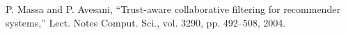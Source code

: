 \documentclass[12pt,letterpaper,openany]{book}
\begin{document}








\begin{thebibliography}{1}
 P. Massa and P. Avesani, “Trust-aware collaborative filtering for recommender systems,” Lect. Notes Comput. Sci., vol. 3290, pp. 492–508, 2004.
\end{thebibliography}
\end{document}

